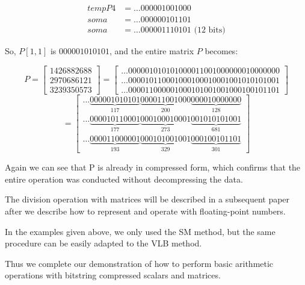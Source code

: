 \documentclass[12pt]{article}
\begin{document}
\begin{align*}
 tempP4&= \ldots000001001000 \\
 soma&=   \ldots000000101101 \\
 soma&=   \ldots000001110101 \text{ (12 bits)}
\end{align*}

So, $P[1,1]$ is $000001010101$, and the entire matrix $P$ becomes:


\begin{equation}
	P = \begin{bmatrix}
			1426882688\\ 
			2970686121\\ 
			3239350573
		\end{bmatrix} 
        =
        \begin{bmatrix}
   			\ldots000001010101000011001000000010000000 \\
			\ldots000010110001000100010001001010101001\\
			\ldots000011000001000101001001000100101101
		\end{bmatrix}
\end{equation}
\begin{equation}
        =
        \begin{bmatrix}

\ldots\underbrace{000001010101}_{117}\underbrace{000011001000}_{200}\underbrace{
000010000000}_{128}\\ 			 

\ldots\underbrace{000010110001}_{177}\underbrace{000100010001}_{273}\underbrace{
001010101001}_{681}\\ 			 

\ldots\underbrace{000011000001}_{193}\underbrace{000101001001}_{329}\underbrace{
000100101101}_{301} 			 
		\end{bmatrix}
\end{equation}

Again we can see that P is already in compressed form, which confirms that the
entire operation was conducted without decompressing the data.

The division operation with matrices will be described in a subsequent paper
after we describe how to represent and operate with floating-point numbers.

In the examples given above, we only used the SM method, but the same procedure
can be easily adapted to the VLB method.

Thus we complete our demonstration of how to perform basic arithmetic
operations with bitstring compressed scalars and matrices.


\end{document}
